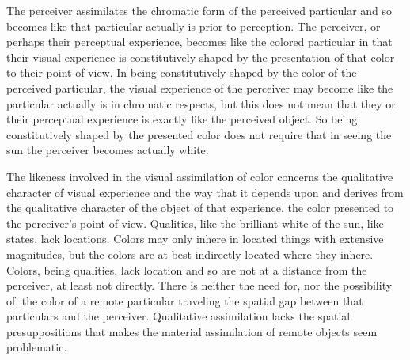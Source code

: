 The perceiver assimilates the chromatic form of the perceived particular and so becomes like that particular actually is prior to perception. The perceiver, or perhaps their perceptual experience, becomes like the colored particular in that their visual experience is constitutively shaped by the presentation of that color to their point of view. In being constitutively shaped by the color of the perceived particular, the visual experience of the perceiver may become like the particular actually is in chromatic respects, but this does not mean that they or their perceptual experience is exactly like the perceived object. So being constitutively shaped by the presented color does not require that in seeing the sun the perceiver becomes actually white.

The likeness involved in the visual assimilation of color concerns the qualitative character of visual experience and the way that it depends upon and derives from the qualitative character of the object of that experience, the color presented to the perceiver's point of view. Qualities, like the brilliant white of the sun, like states, lack locations. Colors may only inhere in located things with extensive magnitudes, but the colors are at best indirectly located where they inhere. Colors, being qualities, lack location and so are not at a distance from the perceiver, at least not directly. There is neither the need for, nor the possibility of, the color of a remote particular traveling the spatial gap between that particulars and the perceiver. Qualitative assimilation lacks the spatial presuppositions that makes the material assimilation of remote objects seem problematic.

